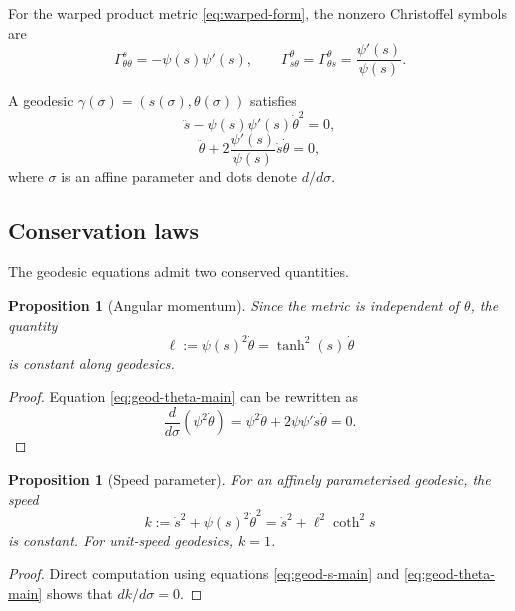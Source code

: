 \documentclass{article}
\newtheorem{proposition}[theorem]{Proposition}
\theoremstyle{definition}
\theoremstyle{remark}
\begin{document}
For the warped product metric \eqref{eq:warped-form}, the nonzero Christoffel 
symbols are
\[
\Gamma^s_{\theta\theta} = -\psi(s)\psi'(s),
\qquad
\Gamma^\theta_{s\theta} = \Gamma^\theta_{\theta s} = \frac{\psi'(s)}{\psi(s)}.
\]

A geodesic $\gamma(\sigma) = (s(\sigma), \theta(\sigma))$ satisfies
\begin{equation}\label{eq:geod-s-main}
\ddot{s} - \psi(s)\psi'(s)\dot{\theta}^2 = 0,
\end{equation}
\begin{equation}\label{eq:geod-theta-main}
\ddot{\theta} + 2\frac{\psi'(s)}{\psi(s)}\dot{s}\dot{\theta} = 0,
\end{equation}
where $\sigma$ is an affine parameter and dots denote $d/d\sigma$.

\subsection{Conservation laws}

The geodesic equations admit two conserved quantities.

\begin{proposition}[Angular momentum]\label{prop:angular-momentum}
Since the metric is independent of $\theta$, the quantity
\begin{equation}\label{eq:angular-momentum-geo}
\ell := \psi(s)^2\dot{\theta} = \tanh^2(s)\,\dot{\theta}
\end{equation}
is constant along geodesics.
\end{proposition}

\begin{proof}
Equation \eqref{eq:geod-theta-main} can be rewritten as
\[
\frac{d}{d\sigma}\left(\psi^2\dot{\theta}\right) 
= \psi^2\ddot{\theta} + 2\psi\psi'\dot{s}\dot{\theta} = 0.
\]
\end{proof}

\begin{proposition}[Speed parameter]\label{prop:speed}
For an affinely parameterised geodesic, the speed
\begin{equation}\label{eq:speed-geo}
k := \dot{s}^2 +  \psi(s)^2 \dot{\theta}^2 = \dot{s}^2 + \ell^2\coth^2 s
\end{equation}
is constant. For unit-speed geodesics, $k=1$.
\end{proposition}

\begin{proof}
Direct computation using equations \eqref{eq:geod-s-main} and \eqref{eq:geod-theta-main} 
shows that $dk/d\sigma = 0$.
\end{proof}
\end{document}
